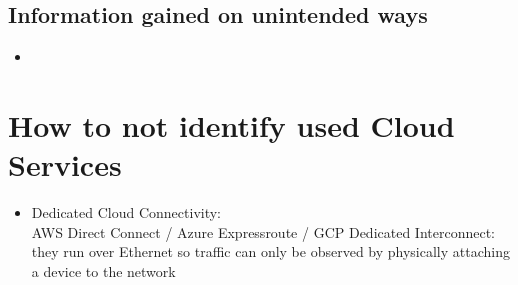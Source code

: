 \documentclass[12pt]{article}
\begin{document}
\subsection*{Information gained on unintended ways}
\begin{itemize}
    \item 
\end{itemize}


\newpage
\section*{How to not identify used Cloud Services}
\begin{itemize}
    \item Dedicated Cloud Connectivity: \\ AWS Direct Connect / Azure Expressroute / GCP Dedicated Interconnect: they run over Ethernet so traffic can only be observed by physically attaching a device to the network
\end{itemize}
\end{document}
